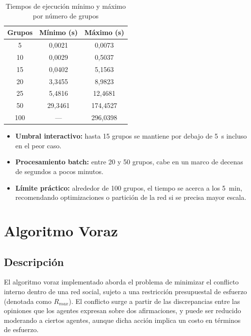 \documentclass[11pt,letter]{article}
\begin{document}
\begin{itemize}
        \begin{table}[h!]
    \centering
    \begin{tabular}{|c|c|c|}
    \hline
    \textbf{Grupos} & \textbf{Mínimo (s)} & \textbf{Máximo (s)} \\
    \hline
    5   & 0{,}0021 & 0{,}0073 \\
    10  & 0{,}0029 & 0{,}5037 \\
    15  & 0{,}0402 & 5{,}1563 \\
    20  & 3{,}3455 & 8{,}9823 \\
    25  & 5{,}4816 & 12{,}4681 \\
    50  & 29{,}3461 & 174{,}4527 \\
    100 & ---      & 296{,}0398 \\
    \hline
    \end{tabular}
    \caption{Tiempos de ejecución mínimo y máximo por número de grupos}
    \label{tab:tiempos-grupos}
        \end{table}


    \begin{itemize}

         \item \textbf{Umbral interactivo:}
        hasta 15 grupos se mantiene por debajo de 5 s incluso en el peor caso.

        \item \textbf{Procesamiento batch:}
        entre 20 y 50 grupos, cabe en un marco de decenas de segundos a pocos minutos.

        \item \textbf{Límite práctico:}
         alrededor de 100 grupos, el tiempo se acerca a los 5 min, recomendando optimizaciones o partición de la red si se precisa mayor escala.

    \end{itemize}


\end{itemize}



    \newpage



    \section{Algoritmo Voraz}

    \subsection{Descripción}
    El algoritmo voraz implementado aborda el problema de minimizar el conflicto interno dentro de una red social, sujeto a una restricción presupuestal de esfuerzo (denotada como $R_{max}$). El conflicto surge a partir de las discrepancias entre las opiniones que los agentes expresan sobre dos afirmaciones, y puede ser reducido moderando a ciertos agentes, aunque dicha acción implica un costo en términos de esfuerzo.
\end{document}
